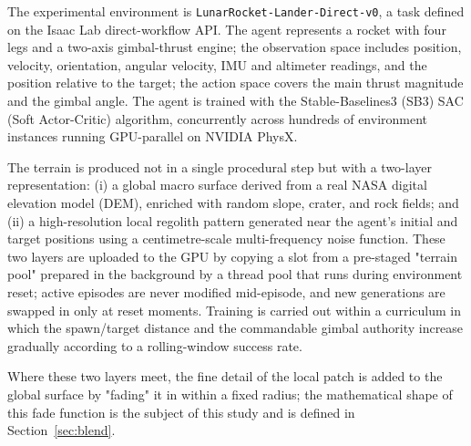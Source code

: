 The experimental environment is \texttt{LunarRocket-Lander-Direct-v0}, a task defined on the Isaac Lab direct-workflow API. The agent represents a rocket with four legs and a two-axis gimbal-thrust engine; the observation space includes position, velocity, orientation, angular velocity, IMU and altimeter readings, and the position relative to the target; the action space covers the main thrust magnitude and the gimbal angle. The agent is trained with the Stable-Baselines3 (SB3) SAC (Soft Actor-Critic) algorithm, concurrently across hundreds of environment instances running GPU-parallel on NVIDIA PhysX.

The terrain is produced not in a single procedural step but with a two-layer representation: (i) a global macro surface derived from a real NASA digital elevation model (DEM), enriched with random slope, crater, and rock fields; and (ii) a high-resolution local regolith pattern generated near the agent's initial and target positions using a centimetre-scale multi-frequency noise function. These two layers are uploaded to the GPU by copying a slot from a pre-staged "terrain pool" prepared in the background by a thread pool that runs during environment reset; active episodes are never modified mid-episode, and new generations are swapped in only at reset moments. Training is carried out within a curriculum in which the spawn/target distance and the commandable gimbal authority increase gradually according to a rolling-window success rate.

Where these two layers meet, the fine detail of the local patch is added to the global surface by "fading" it in within a fixed radius; the mathematical shape of this fade function is the subject of this study and is defined in Section~\ref{sec:blend}.
